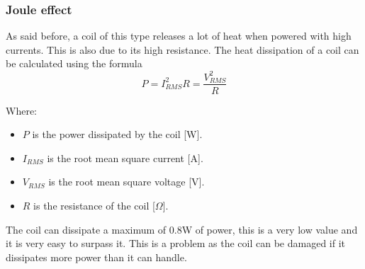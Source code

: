 \subsubsection{Joule effect}
As said before, a coil of this type releases a lot of heat when powered with high currents. This is also due to its high resistance. The heat dissipation of a coil can be calculated using the formula
\begin{equation}
    P = I_{RMS}^2 R = \frac{V_{RMS}^2}{R}
\end{equation}

Where:
\begin{itemize}
    \item \( P \) is the power dissipated by the coil [W].
    \item \( I_{RMS} \) is the root mean square current [A].
    \item \( V_{RMS} \) is the root mean square voltage [V].
    \item \( R \) is the resistance of the coil [\(\Omega\)].
\end{itemize}

The coil can dissipate a maximum of 0.8W of power, this is a very low value and it is very easy to surpass it. This is a problem as the coil can be damaged if it dissipates more power than it can handle.

\begin{center}
\end{center}

